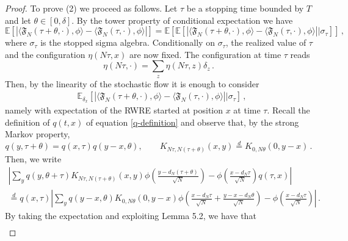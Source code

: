 \documentclass[a4paper,11pt,oneside,reqno]{amsart}
\theoremstyle{definition}
\numberwithin{equation}{section}
\begin{document}
\begin{proof}
{\color{black}To prove (2) we proceed as follows. Let $\tau$ be a stopping time bounded by $T$ and let $\theta\in [0, \delta]$. By the tower property of conditional expectation we have 
\begin{equation*}
	\mathbb{E}\left[|\langle \mathfrak{F}_{N}(\tau+\theta,\cdot),\phi\rangle-\langle \mathfrak{F}_{N}(\tau,\cdot),\phi\rangle|\right]=\mathbb{E}\left[\mathbb{E}\left[|\langle \mathfrak{F}_{N}(\tau+\theta,\cdot),\phi\rangle-\langle \mathfrak{F}_{N}(\tau,\cdot),\phi\rangle|\bigg|\sigma_{\tau}\right]\right]\,,
\end{equation*}
where $\sigma_{\tau}$ is the stopped sigma algebra. Conditionally on $\sigma_{\tau}$, the realized value of $\tau$ and the configuration $\eta(N\tau,x)$ are now fixed. The configuration at time $\tau$ reads
\begin{equation*}
	\eta(N\tau,\cdot)=\sum_{z}\eta(N\tau,z)\delta_{z}\,.
\end{equation*}
Then, by the linearity of the stochastic flow it is enough to consider
\begin{equation*}
	\begin{split}
		&\mathbb{E}_{\delta_{x}}\left[|\langle \mathfrak{F}_{N}(\tau+\theta,\cdot),\phi\rangle-\langle \mathfrak{F}_{N}(\tau,\cdot),\phi\rangle|\bigg|\sigma_{\tau}\right]\,,
	\end{split}
\end{equation*} 
namely with expectation of the RWRE started at position $x$ at time $\tau$. Recall the definition of $q(t,x)$ of equation \eqref{q-definition} and observe that, by the strong Markov property, 
\begin{equation*}
	q(y,\tau+\theta)=q(x,\tau)q(y-x,\theta),\qquad K_{N\tau,N(\tau+\theta)}(x,y)\overset{d}{=}K_{0,N\theta}(0,y-x)\,. 
\end{equation*}
Then, we write
\begin{multline*}
	\left|\sum_{y}q(y,\theta+\tau)K_{N\tau,N(\tau+\theta)}(x,y)\phi\left(\frac{y-d_{N}(\tau+\theta)}{\sqrt{N}}\right)-\phi\left(\frac{x-d_{N}\tau}{\sqrt{N}}\right)q(\tau,x)\right|
	\\ \overset{d}{=} 
	q(x,\tau)\left|\sum_{y}q(y-x,\theta)K_{0,N\theta}(0,y-x)\phi\left(\frac{x-d_{N}\tau}{\sqrt{N}}+\frac{y-x-d_{N}\theta}{\sqrt{N}}\right)-\phi\left(\frac{x-d_{N}\tau}{\sqrt{N}}\right)\right|\,.
\end{multline*}
By taking the expectation and exploiting Lemma 5.2, we have that 
\begin{equation*}
	\begin{split}

\end{split}
\end{equation*}}
\end{proof}
\end{document}
